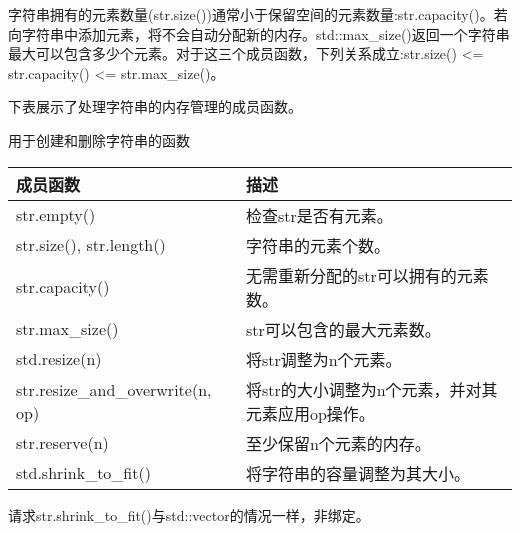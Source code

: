 字符串拥有的元素数量(str.size())通常小于保留空间的元素数量:str.capacity()。若向字符串中添加元素，将不会自动分配新的内存。std::max\_size()返回一个字符串最大可以包含多少个元素。对于这三个成员函数，下列关系成立:str.size() <= str.capacity() <= str.max\_size()。

下表展示了处理字符串的内存管理的成员函数。

\begin{center}
用于创建和删除字符串的函数
\end{center}


\begin{longtable}[c]{|l|l|}
\hline
\textbf{成员函数} & \textbf{描述}                                  \\ \hline
\endfirsthead
%
\endhead
%
str.empty()               & 检查str是否有元素。                           \\ \hline
str.size(), str.length()  & 字符串的元素个数。                        \\ \hline
str.capacity()            & 无需重新分配的str可以拥有的元素数。 \\ \hline
str.max\_size()           & str可以包含的最大元素数。              \\ \hline
std.resize(n)             & 将str调整为n个元素。                             \\ \hline
str.resize\_and\_overwrite(n, op) & 将str的大小调整为n个元素，并对其元素应用op操作。 \\ \hline
str.reserve(n)            & 至少保留n个元素的内存。                \\ \hline
std.shrink\_to\_fit()     & 将字符串的容量调整为其大小。      \\ \hline
\end{longtable}

请求str.shrink\_to\_fit()与std::vector的情况一样，非绑定。


